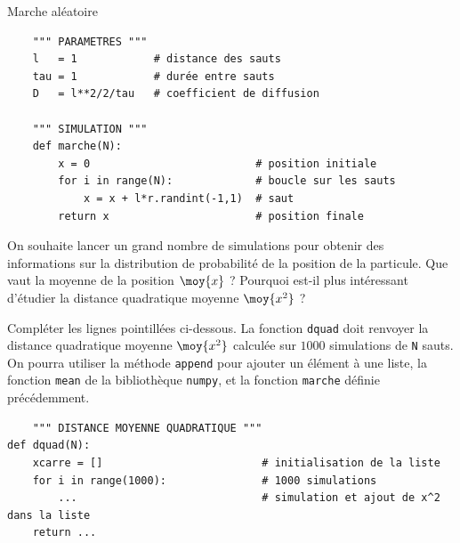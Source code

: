 \begin{exo}[PC][1][python]{Marche aléatoire}
\begin{quest}
\begin{verbatim}
    """ PARAMETRES """
    l   = 1            # distance des sauts
    tau = 1            # durée entre sauts
    D   = l**2/2/tau   # coefficient de diffusion
    
    """ SIMULATION """
    def marche(N):
        x = 0                          # position initiale
        for i in range(N):             # boucle sur les sauts
            x = x + l*r.randint(-1,1)  # saut
        return x                       # position finale
    \end{verbatim}

\item On souhaite lancer un grand nombre de simulations pour obtenir des informations sur la distribution de probabilité de la position de la particule.
Que vaut la moyenne de la position $\moy{x}$ ? Pourquoi est-il plus intéressant d'étudier la distance quadratique moyenne $\moy{x^2}$ ?
\item 
  Compléter les lignes pointillées ci-dessous. La fonction \texttt{dquad} doit renvoyer la distance quadratique moyenne $\moy{x^2}$ calculée sur $1000$ simulations de \texttt{N} sauts. On pourra utiliser la méthode \texttt{append} pour ajouter un élément à une liste, la fonction \texttt{mean} de la bibliothèque \texttt{numpy}, et la fonction \texttt{marche} définie précédemment.
  \begin{verbatim}
    """ DISTANCE MOYENNE QUADRATIQUE """
def dquad(N):
    xcarre = []                         # initialisation de la liste
    for i in range(1000):               # 1000 simulations
        ...                             # simulation et ajout de x^2 dans la liste
    return ...                          

  \end{verbatim}


\end{quest}
\end{exo}
